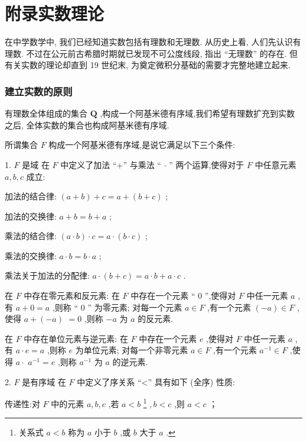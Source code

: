 \chapter{附录实数理论}

在中学数学中, 我们已经知道实数包括有理数和无理数. 从历史上看, 人们先认识有理数. 不过在公元前古希腊时期就已发现不可公度线段, 指出 “无理数” 的存在. 但有关实数的理论却直到 19 世纪末, 为奠定微积分基础的需要才完整地建立起来.

\subsection{建立实数的原则}

有理数全体组成的集合 \(\mathbf{Q}\) ,构成一个阿基米德有序域,我们希望有理数扩充到实数之后, 全体实数的集合也构成阿基米德有序域.

所谓集合 \(F\) 构成一个阿基米德有序域,是说它满足以下三个条件:

1. \(F\) 是域 在 \(F\) 中定义了加法 “+” 与乘法 “ \(\cdot\) ” 两个运算,使得对于 \(F\) 中任意元素 \(a,b,c\) 成立:

加法的结合律: \(\left( {a + b}\right)  + c = a + \left( {b + c}\right)\) ;

加法的交换律: \(a + b = b + a\) ;

乘法的结合律: \(\left( {a \cdot  b}\right)  \cdot  c = a \cdot  \left( {b \cdot  c}\right)\) ;

乘法的交换律: \(a \cdot  b = b \cdot  a\) ;

乘法关于加法的分配律: \(a \cdot  \left( {b + c}\right)  = a \cdot  b + a \cdot  c\) .

在 \(F\) 中存在零元素和反元素: 在 \(F\) 中存在一个元素 “ 0 ”,使得对 \(F\) 中任一元素 \(a\) , 有 \(a + 0 = a\) ,则称 “ 0 ” 为零元素; 对每一个元素 \(a \in  F\) ,有一个元素 \(\left( {-a}\right)  \in  F\) ,使得 \(a + \left( {-a}\right)\)  \(= 0\) ,则称 \(- a\) 为 \(a\) 的反元素.

在 \(F\) 中存在单位元素与逆元素: 在 \(F\) 中存在一个元素 \(e\) ,使得对 \(F\) 中任一元素 \(a\) , 有 \(a \cdot  e = a\) ,则称 \(e\) 为单位元素; 对每一个非零元素 \(a \in  F\) ,有一个元素 \({a}^{-1} \in  F\) ,使得 \(a \cdot\)  \({a}^{-1} = e\) ,则称 \({a}^{-1}\) 为 \(a\) 的逆元素.

2. \(F\) 是有序域 在 \(F\) 中定义了序关系 “<” 具有如下 (全序) 性质:

传递性:对 \(F\) 中的元素 \(a,b,c\) ,若 \(a < b\) \footnote{关系式 \(a < b\) 称为 \(a\) 小于 \(b\) ,或 \(b\) 大于 \(a\) .} \(,b < c\) ,则 \(a < c\) ；

